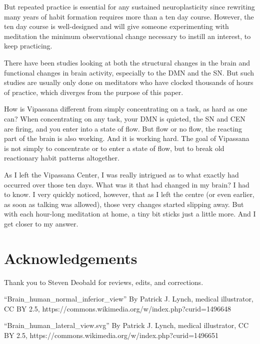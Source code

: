\documentclass[a4paper, amsfonts, amssymb, amsmath, reprint, showkeys, nofootinbib, twoside]{revtex4-1}
\begin{document}
But repeated practice is essential for any sustained neuroplasticity since rewriting
many years of habit formation requires more than a ten day course. However, the ten
day course is well-designed and will give someone experimenting with meditation the
minimum observational change necessary to instill an interest, to keep practicing.

There have been studies looking at both the structural changes in the brain and
functional changes in brain activity, especially to the DMN and the SN. But such
studies are usually only done on meditators who have clocked thousands of hours of
practice, which diverges from the purpose of this paper. \cite {tibeteanmonks
, experiencemed, experiencemeda}

How is Vipassana different from simply concentrating on a task, as hard as one can?
When concentrating on any task, your DMN is quieted, the SN and CEN are firing, and you
enter into a state of flow. But flow or no flow, the reacting part of the brain is
also working. And it is working hard. The goal of Vipassana is not simply to
concentrate or to enter a state of flow, but to break old reactionary habit patterns
altogether.

As I left the Vipassana Center, I was really intrigued as to what exactly had
occurred over those ten days. What was it that had changed in my brain? I had to
know. I very quickly noticed, however, that as I left the centre (or even earlier, as
soon as talking was allowed), those very changes started slipping away. But with each
hour-long meditation at home, a tiny bit sticks just a little more. And I get closer
to my answer.

\section{Acknowledgements}

Thank you to Steven Deobald for reviews, edits, and corrections.

``Brain\_human\_normal\_inferior\_view'' By Patrick J. Lynch, medical illustrator, CC BY
2.5, https://commons.wikimedia.org/w/index.php?curid=1496648

``Brain\_human\_lateral\_view.svg'' By Patrick J. Lynch, medical illustrator, CC BY
2.5, https://commons.wikimedia.org/w/index.php?curid=1496651
\end{document}
